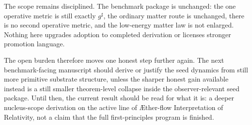 \documentclass[11pt]{article}
\newcommand{\Aflow}{\AE{}ther-flow}
\newcommand{\TheoryName}{\Aflow{} Interpretation of Relativity}
\newcommand{\CompletedMetric}{g^{\sharp}}
\begin{document}
The scope remains disciplined. The benchmark package is unchanged: the one operative metric is still exactly \(\CompletedMetric\), the ordinary matter route is unchanged, there is no second operative metric, and the low-energy matter law is not enlarged. Nothing here upgrades adoption to completed derivation or licenses stronger promotion language.

The open burden therefore moves one honest step further again. The next benchmark-facing manuscript should derive or justify the seed dynamics from still more primitive substrate structure, unless the sharper honest gain available instead is a still smaller theorem-level collapse inside the observer-relevant seed package. Until then, the current result should be read for what it is: a deeper nucleus-scope derivation on the active line of \TheoryName{}, not a claim that the full first-principles program is finished.
\end{document}
